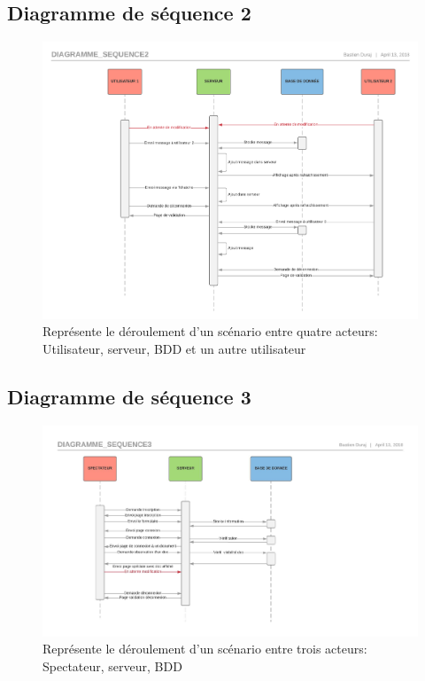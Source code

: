 \documentclass[11pt,a4paper]{article}
\begin{document}
\subsection{Diagramme de séquence 2}
\begin{figure}[!h]
\centering
\includegraphics[scale=0.6]{Image/Diagramme_sequence2.pdf}
\caption{Représente le déroulement d'un scénario entre quatre acteurs: Utilisateur, serveur, BDD et un autre utilisateur}
\end{figure}
\newpage
\subsection{Diagramme de séquence 3}
\begin{figure}[!h]
\centering
\includegraphics[scale=0.7]{Image/Diagramme_sequence3.pdf}
\caption{Représente le déroulement d'un scénario entre trois acteurs: Spectateur, serveur, BDD}
\end{figure}
\end{document}
